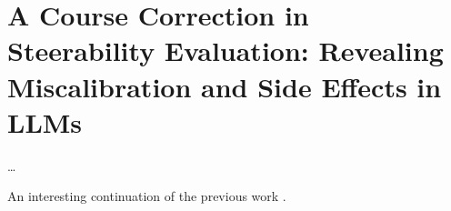 \section{A Course Correction in Steerability Evaluation: Revealing Miscalibration and Side Effects in LLMs}

\textcite{chang2026CourseCorrectionSteerability} \dots

An interesting continuation of the previous work \parencite{chang2024MeasuringSteerabilityLarge}.